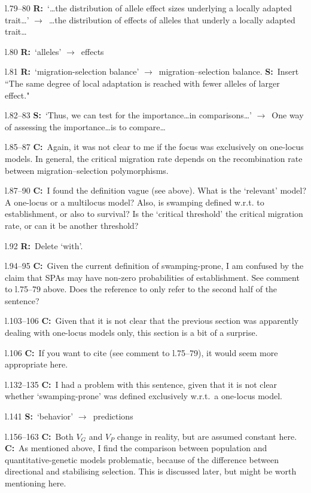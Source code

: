 \documentclass[11pt]{article}
\newenvironment{my_description}
{\begin{description}
  \setlength{\itemsep}{2pt}
  \setlength{\parskip}{0pt}
  \setlength{\parsep}{0pt}}
{\end{description}}
\newcommand{\ra}{$\rightarrow$\ }
\newcommand{\C}{\textbf{C:}\ }
\newcommand{\R}{\textbf{R:}\ }
\newcommand{\V}{\textbf{S:}\ }
\begin{document}
\begin{my_description}
	\item[l.79--80] \R `\dots the distribution of allele effect sizes underlying a locally adapted trait\dots' \ra \dots the distribution of effects of alleles that underly a locally adapted trait\dots
	\item[l.80] \R `alleles' \ra effects
	\item[l.81] \R `migration-selection balance' \ra migration--selection balance. \V Insert ``The same degree of local adaptation is reached with fewer alleles of larger effect."
	\item[l.82--83] \V `Thus, we can test for the importance\dots in comparisons\dots' \ra One way of assessing the importance\dots is to compare\dots
	\item[l.85--87] \C Again, it was not clear to me if the focus was exclusively on one-locus models. In general, the critical migration rate depends on the recombination rate between migration--selection polymorphisms.
	\item[l.87--90] \C I found the definition vague (see above). What is the `relevant' model? A one-locus or a multilocus model? Also, is swamping defined w.r.t. to establishment, or also to survival? Is the `critical threshold' the critical migration rate, or can it be another threshold?
	\item[l.92] \R Delete `with'.
	\item[l.94--95] \C Given the current definition of swamping-prone, I am confused by the claim that SPAs may have non-zero probabilities of establishment. See comment to l.75--79 above. Does the reference to \cite{Yeaman:2011uq} only refer to the second half of the sentence?
	\item[l.103--106] \C Given that it is not clear that the previous section was apparently dealing with one-locus models only, this section is a bit of a surprise.
	\item[l.106] \C If you want to cite \cite{Aeschbacher:2014fk} (see comment to l.75--79), it would seem more appropriate here.
	\item[l.132--135] \C I had a problem with this sentence, given that it is not clear whether `swamping-prone' was defined exclusively w.r.t.\ a one-locus model.
	\item[l.141] \V `behavior' \ra predictions
	\item[l.156--163] \C Both $V_G$ and $V_P$ change in reality, but are assumed constant here. \C As mentioned above, I find the comparison between population and quantitative-genetic models problematic, because of the difference between directional and stabilising selection. This is discussed later, but might be worth mentioning here.

\end{my_description}
\end{document}
